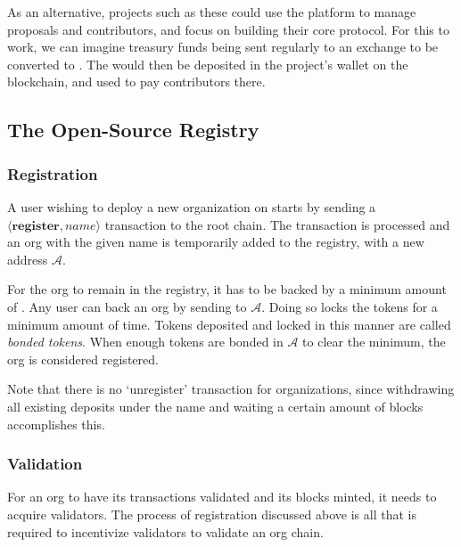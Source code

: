 As an alternative, projects such as these could use the \oscoin{} platform to
manage proposals and contributors, and focus on building their core protocol.
For this to work, we can imagine treasury funds being sent regularly to an
exchange to be converted to \oscoin{}. The \oscoin{} would then be deposited in the
project’s wallet on the \oscoin{} blockchain, and used to pay contributors there.


\subsection{The Open-Source Registry}


\subsubsection{Registration}
A user wishing to deploy a new organization on \oscoin{} starts by sending a
$\langle \mathbf{register}, name \rangle$ transaction to the root chain. The
transaction is processed and an org with the given name is temporarily added
to the registry, with a new \oscoin{} address $\mathcal{A}$.

For the org to remain in the registry, it has to be backed by a minimum amount
of \oscoin{}. Any user can back an org by sending \oscoin{} to $\mathcal{A}$.
Doing so locks the tokens for a minimum amount of time. Tokens deposited and
locked in this manner are called \emph{bonded tokens}. When enough tokens are
bonded in $\mathcal{A}$ to clear the minimum, the org is considered registered.

Note that there is no `unregister' transaction for organizations, since
withdrawing all existing deposits under the name and waiting a certain amount
of blocks accomplishes this.

\subsubsection{Validation}
For an org to have its transactions validated and its blocks minted, it needs
to acquire validators. The process of registration discussed above is all that
is required to incentivize validators to validate an org chain.

